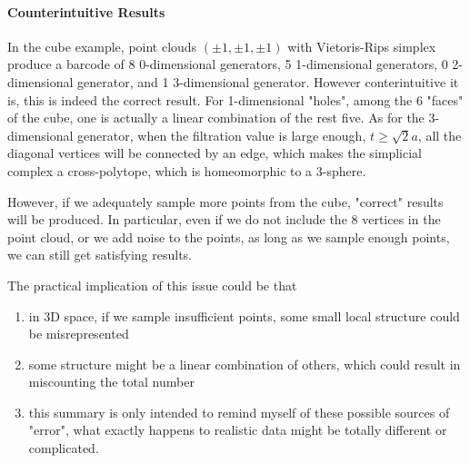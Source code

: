 \documentclass[10pt,a4paper]{article}
\begin{document}
\paragraph{Counterintuitive Results}
In the cube example, point clouds ${(\pm 1,\pm 1,\pm 1)}$ with Vietoris-Rips simplex produce a barcode of 8 0-dimensional generators, 5 1-dimensional generators, 0 2-dimensional generator, and 1 3-dimensional generator. However conterintuitive it is, this is indeed the correct result. For 1-dimensional "holes", among the 6 "faces" of the cube, one is actually a linear combination of the rest five. As for the 3-dimensional generator, when the filtration value is large enough, $t\geq\sqrt{2}a$, all the diagonal vertices will be connected by an edge, which makes the simplicial complex a cross-polytope, which is homeomorphic to a 3-sphere.\par
However, if we adequately sample more points from the cube, "correct" results will be produced. In particular, even if we do not include the 8 vertices in the point cloud, or we add noise to the points, as long as we sample enough points, we can still get satisfying results.\par
The practical implication of this issue could be that 
\begin{enumerate}
	\item in 3D space, if we sample insufficient points, some small local structure could be misrepresented
	\item some structure might be a linear combination of others, which could result in miscounting the total number
	\item this summary is only intended to remind myself of these possible sources of "error", what exactly happens to realistic data might be totally different or complicated.
\end{enumerate} 
\end{document}
